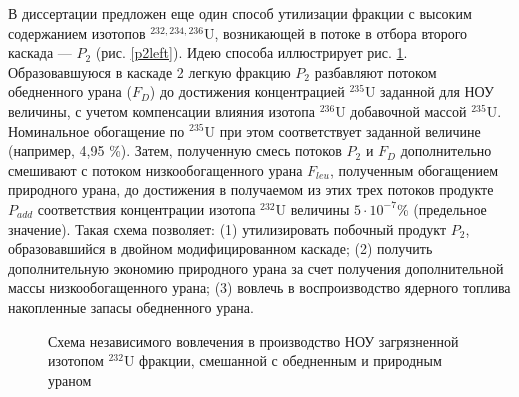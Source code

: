 В диссертации предложен еще один способ утилизации фракции с высоким содержанием изотопов $^{232,234,236}$U, возникающей в потоке в отбора второго каскада --- $P_2$ (рис. \ref{p2left}). Идею способа иллюстрирует рис. \ref{P2utilization}. Образовавшуюся в каскаде 2 легкую фракцию $P_2$ разбавляют потоком обедненного урана ($F_D$) до достижения концентрацией $^{235}$U заданной для НОУ величины, с учетом компенсации влияния изотопа $^{236}$U добавочной массой $^{235}$U. Номинальное обогащение по $^{235}$U при этом соответствует заданной величине (например, 4,95 \%). Затем, полученную смесь потоков $P_2$ и $F_D$ дополнительно смешивают с потоком низкообогащенного урана $F_{leu}$, полученным обогащением природного урана, до достижения в получаемом из этих трех потоков продукте $P_{add}$ соответствия концентрации изотопа $^{232}$U величины $5\cdot10^{-7}$\% (предельное значение). Такая схема позволяет: (1) утилизировать побочный продукт $P_2$, образовавшийся в двойном модифицированном каскаде; (2) получить дополнительную экономию природного урана за счет получения дополнительной массы низкообогащенного урана; (3) вовлечь в воспроизводство ядерного топлива накопленные запасы обедненного урана. 

\begin{figure}[ht]
    \caption{Схема независимого вовлечения в производство НОУ загрязненной изотопом $^{232}$U фракции, смешанной с обедненным и природным ураном}\label{P2utilization}
\end{figure}

